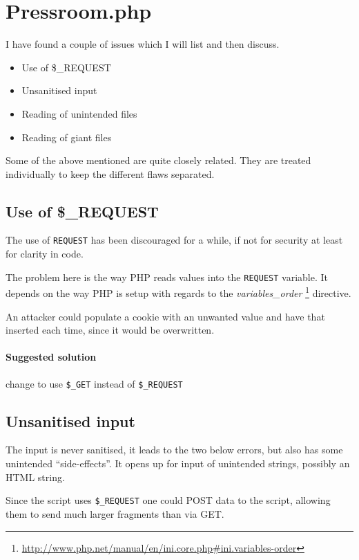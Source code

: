 \section{Pressroom.php}
I have found a couple of issues which I will list and then discuss.

\begin{itemize}
\item Use of \$\_REQUEST
\item Unsanitised input
\item Reading of unintended files
\item Reading of giant files
\end{itemize}

Some of the above mentioned are quite closely related. They are treated 
individually to keep the different flaws separated.

\subsection{Use of \$\_REQUEST}
The use of \texttt{REQUEST} has been discouraged for a while, if not for 
security at least for clarity in code.

The problem here is the way PHP reads values into the \texttt{REQUEST}
variable. It depends on the way PHP is setup with regards to the
\textit{variables\_order}
\footnote{\href{http://www.php.net/manual/en/ini.core.php\#ini.variables-order}
  {http://www.php.net/manual/en/ini.core.php\#ini.variables-order}}
directive.

An attacker could populate a cookie with an unwanted value and have that
inserted each time, since it would be overwritten.

\paragraph{Suggested solution} change to use \texttt{\$\_GET} instead of
\texttt{\$\_REQUEST}

\subsection{Unsanitised input}
The input is never sanitised, it leads to the two below errors, but also has
some unintended ``side-effects''. It opens up for input of unintended strings,
possibly an HTML string.

Since the script uses \texttt{\$\_REQUEST} one could POST data to the script,
allowing them to send much larger fragments than via GET.

